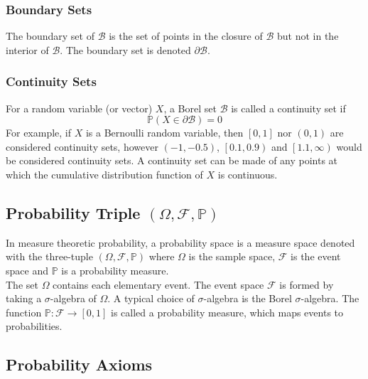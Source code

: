 \documentclass[11pt]{report} %
\begin{document}
\subsubsection{Boundary Sets}

The boundary set of $\mathcal{B}$ is the set of points in the closure of $\mathcal{B}$ but not in the interior of $\mathcal{B}$. The boundary set is denoted $\partial\mathcal{B}$.

\subsubsection{Continuity Sets}

For a random variable (or vector) $X$, a Borel set $\mathcal{B}$ is called a continuity set if
\begin{equation}
\mathbb{P}\left(X\in \partial\mathcal{B}\right) = 0
\end{equation}
For example, if $X$ is a Bernoulli random variable, then $\left[0, 1\right]$ nor $\left(0, 1\right)$ are considered continuity sets, however $\left(-1, -0.5\right)$, $\left[0.1, 0.9\right)$ and $\left[1.1, \infty\right)$ would be considered continuity sets. A continuity set can be made of any points at which the cumulative distribution function of $X$ is continuous.

\subsection{Probability Triple $\left(\Omega, \mathcal{F}, \mathbb{P}\right)$}
In measure theoretic probability, a probability space is a measure space denoted with the three-tuple $\left(\Omega, \mathcal{F}, \mathbb{P}\right)$ where $\Omega$ is the sample space, $\mathcal{F}$ is the event space and $\mathbb{P}$ is a probability measure. \\

The set $\Omega$ contains each elementary event. The event space $\mathcal{F}$ is formed by taking a $\sigma$-algebra of $\Omega$. A typical choice of $\sigma$-algebra is the Borel $\sigma$-algebra. The function $\mathbb{P}: \mathcal{F} \to \left[0, 1\right]$ is called a probability measure, which maps events to probabilities.

\subsection{Probability Axioms}
\end{document}
